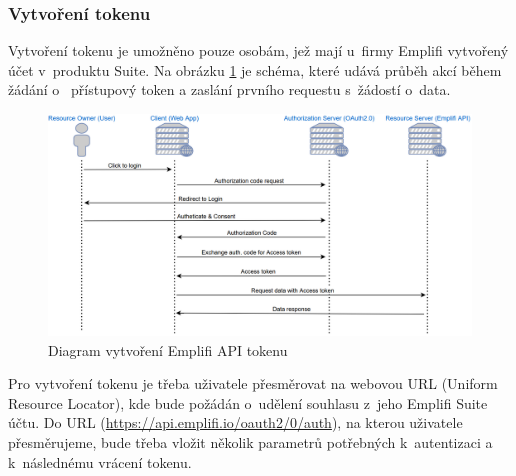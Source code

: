\documentclass[czech, bc, kiv, he, iso690numb]{fasthesis}
\begin{document}
\subsubsection{Vytvoření tokenu}

Vytvoření tokenu je umožněno pouze osobám, jež mají u~firmy Emplifi vytvořený účet v~produktu Suite. Na obrázku \ref{fig:emplifAPIDiagram} je schéma, které udává průběh akcí během žádání o~
přístupový token a zaslání prvního requestu s~žádostí o~data.
\begin{figure}
	\centering
	\includegraphics[width=1\textwidth]{pictures/emplifiAPI.png}
	\caption{Diagram vytvoření Emplifi API tokenu \cite{emplifiDocs}}
	\label{fig:emplifAPIDiagram}
\end{figure}

Pro vytvoření tokenu je třeba uživatele přesměrovat na webovou URL (Uniform Resource Locator), kde bude požádán o~udělení souhlasu z~jeho Emplifi Suite účtu.
Do URL (\url{https://api.emplifi.io/oauth2/0/auth}), na kterou uživatele přesměrujeme, bude třeba vložit několik parametrů potřebných k~autentizaci a k~následnému vrácení tokenu. 
\end{document}
